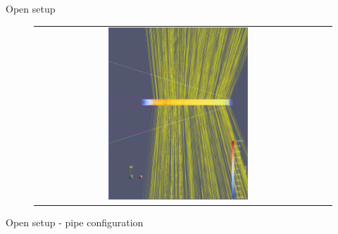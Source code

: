 \documentclass[aspectratio=43,t]{beamer}
\begin{document}
\begin{frame}[fragile]{Open setup}
\begin{figure}
{\begin{tabular}{c c}
            \includegraphics[width=0.5\textwidth]{images/open_rand/4.png} \\
        \end{tabular}
		}
    \end{figure}
    \end{frame}

	
	\begin{frame}[fragile]{Open setup - pipe configuration}
	\begin{figure}
        \centering
    \end{figure}
    \end{frame}
\end{document}
